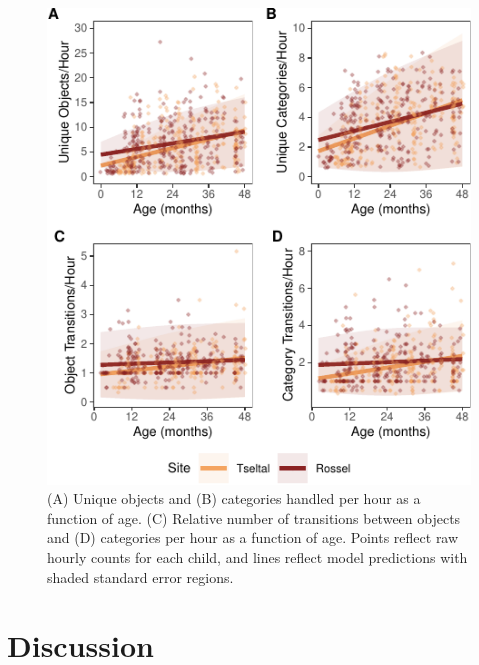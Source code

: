 \documentclass[10pt, letterpaper]{article}
\newenvironment{CodeChunk}{}{}
\begin{document}
\begin{CodeChunk}
\begin{figure}[!ht]

{\centering \includegraphics{figs/age-effects-fig-1} 

}

\caption[(A) Unique objects and (B) categories handled per hour as a function of age]{(A) Unique objects and (B) categories handled per hour as a function of age. (C) Relative number of transitions between objects and (D) categories per hour as a function of age. Points reflect raw hourly counts for each child, and lines reflect model predictions with shaded standard error regions.}\label{fig:age-effects-fig}
\end{figure}
\end{CodeChunk}

\hypertarget{discussion}{%
\section{Discussion}\label{discussion}}
\end{document}
